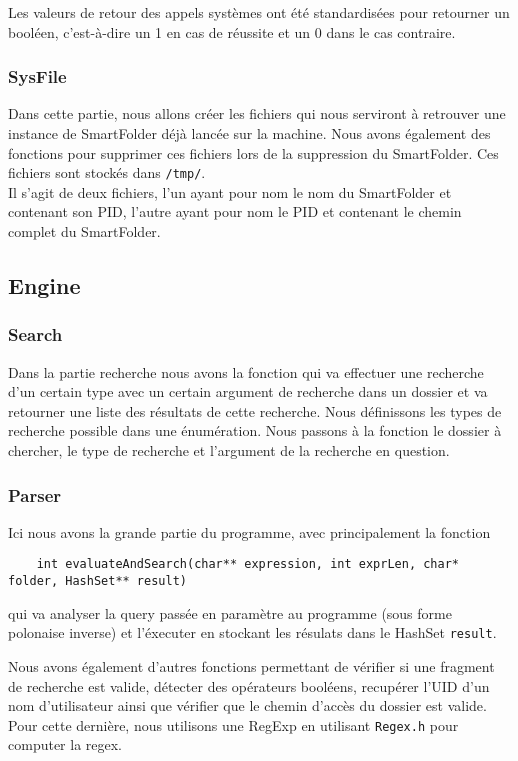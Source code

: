 \documentclass[a4paper]{article}
\begin{document}
Les valeurs de retour des appels systèmes ont été standardisées pour retourner un booléen, c'est-à-dire un 1 en cas de réussite et un 0 dans le cas contraire.
\subsubsection{SysFile}
Dans cette partie, nous allons créer les fichiers qui nous serviront à retrouver une instance de SmartFolder déjà lancée sur la machine. Nous avons également des fonctions pour supprimer ces fichiers lors de la suppression du SmartFolder. Ces fichiers sont stockés dans \verb+/tmp/+.\\

Il s'agit de deux fichiers, l'un ayant pour nom le nom du SmartFolder et contenant son PID, l'autre ayant pour nom le PID et contenant le chemin complet du SmartFolder.
\subsection{Engine}
\subsubsection{Search}
Dans la partie recherche nous avons la fonction qui va effectuer une recherche d'un certain type avec un certain argument de recherche dans un dossier et va retourner une liste des résultats de cette recherche. Nous définissons les types de recherche possible dans une énumération. Nous passons à la fonction le dossier à chercher, le type de recherche et l'argument de la recherche en question.
\subsubsection{Parser}
Ici nous avons la grande partie du programme, avec principalement la fonction
\begin{verbatim}
	int evaluateAndSearch(char** expression, int exprLen, char* folder, HashSet** result)
\end{verbatim}
qui va analyser la query passée en paramètre au programme (sous forme polonaise inverse) et l'éxecuter en stockant les résulats dans le HashSet \verb+result+.

Nous avons également d'autres fonctions permettant de vérifier si une fragment de recherche est valide, détecter des opérateurs booléens, recupérer l'UID d'un nom d'utilisateur ainsi que vérifier que le chemin d'accès du dossier est valide. Pour cette dernière, nous utilisons une RegExp en utilisant \verb+Regex.h+ pour computer la regex.
\end{document}
